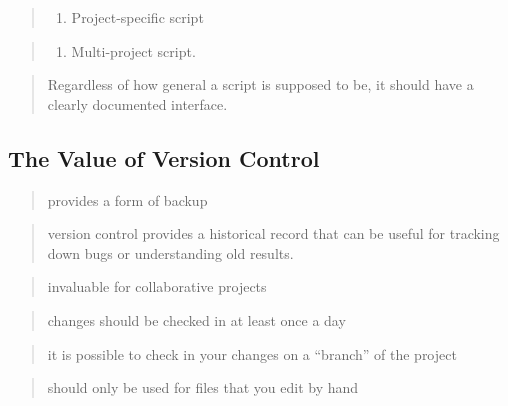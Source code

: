 \documentclass[12pt,]{book}
\newenvironment{Shaded}{}{}
\providecommand{\tightlist}{%
  \setlength{\itemsep}{0pt}\setlength{\parskip}{0pt}}
\begin{document}
\begin{quote}
\begin{enumerate}
\def\labelenumi{\arabic{enumi}.}
\setcounter{enumi}{2}
\tightlist
\item
  Project-specific script
\end{enumerate}
\end{quote}

\begin{quote}
\begin{enumerate}
\def\labelenumi{\arabic{enumi}.}
\setcounter{enumi}{3}
\tightlist
\item
  Multi-project script.
\end{enumerate}
\end{quote}

\begin{quote}
Regardless of how general a script is supposed to be, it should have a
clearly documented interface.
\end{quote}

\subsection{The Value of Version
Control}\label{the-value-of-version-control}

\begin{quote}
provides a form of backup
\end{quote}

\begin{quote}
version control provides a historical record that can be useful for
tracking down bugs or understanding old results.
\end{quote}

\begin{quote}
invaluable for collaborative projects
\end{quote}

\begin{quote}
changes should be checked in at least once a day
\end{quote}

\begin{quote}
it is possible to check in your changes on a ``branch'' of the project
\end{quote}

\begin{quote}
should only be used for files that you edit by hand
\end{quote}

\begin{Shaded}
\begin{Highlighting}[]

\end{Highlighting}
\end{Shaded}
\end{document}
